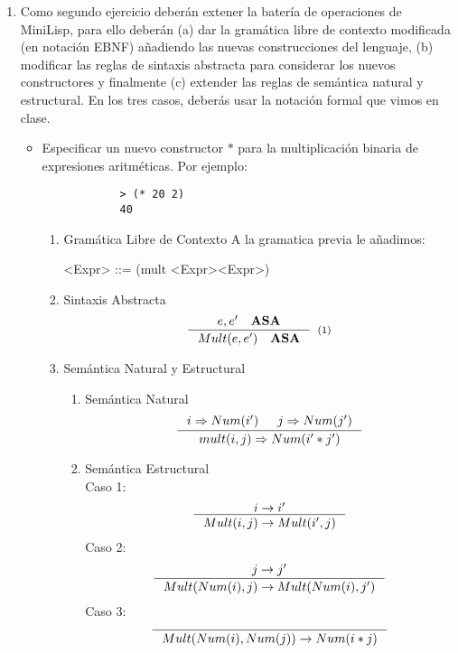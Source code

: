 \documentclass{article}
\begin{document}
\begin{enumerate}
    \item Como segundo ejercicio deberán extener la batería de operaciones de MiniLisp, para ello deberán (a) dar la gramática libre de contexto modificada (en notación EBNF) añadiendo las nuevas construcciones del lenguaje, (b) modificar las reglas de sintaxis abstracta para considerar los nuevos constructores y finalmente (c) extender las reglas de semántica natural y estructural. En los tres casos, deberás usar la notación formal que vimos en clase.

    \begin{itemize}
        \item Especificar un nuevo constructor $*$ para la multiplicación binaria de expresiones aritméticas. Por ejemplo:

        \begin{verbatim}
            > (* 20 2)
            40
        \end{verbatim}

        \begin{enumerate}
            \item Gramática Libre de Contexto
            A la gramatica previa le añadimos:
            \\
            \begin{grammar}
                <Expr> ::= (mult <Expr><Expr>)
            \end{grammar}
            \item Sintaxis Abstracta
                \[
                    \inference{e,e' \quad \textbf{ASA}}{Mult(e,e') \quad \textbf{ASA}}[(1)]
                \]
            \item Semántica Natural y Estructural
            \begin{enumerate}
                \item Semántica Natural
                \[
                \inference{i\Rightarrow Num(i') & j\Rightarrow Num(j')}{mult(i,j)\Rightarrow Num(i'*j')}
                \]
                \item Semántica Estructural\\
                Caso 1: 
                \[ \inference{i\rightarrow i'}{Mult(i,j)\rightarrow Mult(i',j)}\]
                Caso 2:
                \[ \inference{j\rightarrow j'}{Mult(Num(i),j)\rightarrow Mult(Num(i),j')}\]
                Caso 3:
                \[ \inference{}{Mult(Num(i),Num(j))\rightarrow Num(i*j)}\]
            \end{enumerate}
        \end{enumerate}


\end{itemize}
\end{enumerate}
\end{document}
